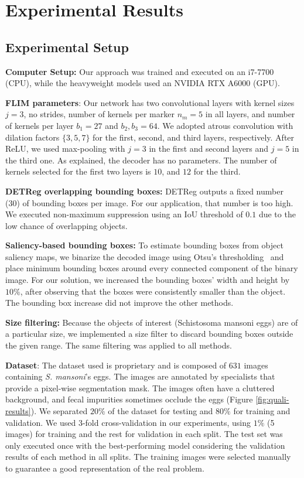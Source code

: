 \documentclass[times,twocolumn,final,authoryear]{elsarticle}
\begin{document}
\section{Experimental Results}\label{sec:results}

\subsection{Experimental Setup}
    \textbf{Computer Setup:} Our approach was trained and executed on an i7-7700 (CPU), while the heavyweight models used an NVIDIA RTX A6000 (GPU).

    \textbf{FLIM parameters}: Our network has two convolutional layers with kernel sizes $j = 3$, no strides, number of kernels per marker $n_m = 5$ in all layers, and number of kernels per layer $b_1 = 27$ and $b_2,b_3 = 64$. We adopted atrous convolution with dilation factors $\{3,5,7\}$ for the first, second, and third layers, respectively. After ReLU, we used max-pooling with $j=3$ in the first and second layers and $j=5$ in the third one. As explained, the decoder has no parameters. The number of kernels selected for the first two layers is $10$, and $12$ for the third.
    
    \textbf{DETReg overlapping bounding boxes:} DETReg outputs a fixed number (30) of bounding boxes per image. For our application, that number is too high. We executed non-maximum suppression using an IoU threshold of $0.1$ due to the low chance of overlapping objects.
    
    \textbf{Saliency-based bounding boxes:} To estimate bounding boxes from object saliency maps, we binarize the decoded image using Otsu's thresholding~\cite{otsu1979threshold} and place minimum bounding boxes around every connected component of the binary image. For our solution, we increased the bounding boxes' width and height by $10\%$, after observing that the boxes were consistently smaller than the object. The bounding box increase did not improve the other methods.
    
    \textbf{Size filtering:} Because the objects of interest (Schistosoma mansoni eggs) are of a particular size, we implemented a size filter to discard bounding boxes outside the given range. The same filtering was applied to all methods.
    
    \textbf{Dataset}: The dataset used is proprietary and is composed of $631$ images containing \textit{S. mansoni}'s eggs. The images are annotated by specialists that provide a pixel-wise segmentation mask. The images often have a cluttered background, and fecal impurities sometimes occlude the eggs (Figure \ref{fig:quali-results}). We separated $20\%$ of the dataset for testing and $80\%$ for training and validation. We used 3-fold cross-validation in our experiments, using $1\%$ (5 images) for training and the rest for validation in each split. The test set was only executed once with the best-performing model considering the validation results of each method in all splits. The training images were selected manually to guarantee a good representation of the real problem.
    
\end{document}
